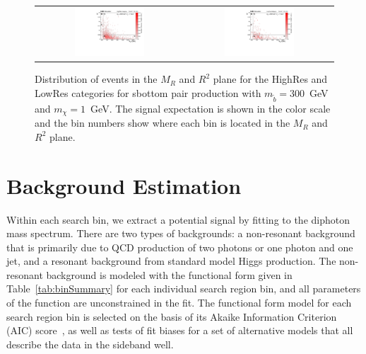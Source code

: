 \begin{figure}[ht!]
\centering
 \begin{tabular}{cc}
\includegraphics[width=0.49\textwidth, angle=0.]{figs/SignalT2BH_300_1_MRRsq_highres.pdf}  & 
\includegraphics[width=0.49\textwidth, angle=0.]{figs/SignalT2BH_300_1_MRRsq_lowres.pdf}  
\end{tabular}
\caption{ Distribution of events in the $M_{R}$ and $R^{2}$ plane for the HighRes and LowRes categories
for sbottom pair production with $m_{\tilde{b}}=300$~GeV and $m_{\chi}=1$~GeV. 
The signal expectation is shown in the
color scale and the bin numbers show where each bin is located in the $M_{R}$ and $R^{2}$ plane. 
\label{fig:SignalModelMRRsq_HighResLowRes}}
\end{figure}



\section{Background Estimation}\label{sec:bkg}

Within each search bin, we extract a potential signal by fitting to the
diphoton mass spectrum. There are two types of backgrounds: 
a non-resonant background that is primarily due to QCD production
of two photons or one photon and one jet, and a resonant background
from standard model Higgs production. The non-resonant background
is modeled with the functional form given in Table~\ref{tab:binSummary}
for each individual search region bin, and all parameters of
the function are unconstrained in the fit. The functional form model
for each search region bin is selected on the basis of its Akaike 
Information Criterion (AIC) score~\cite{AIC}, as well as tests of
fit biases for a set of alternative models that all describe the 
data in the sideband well. 

